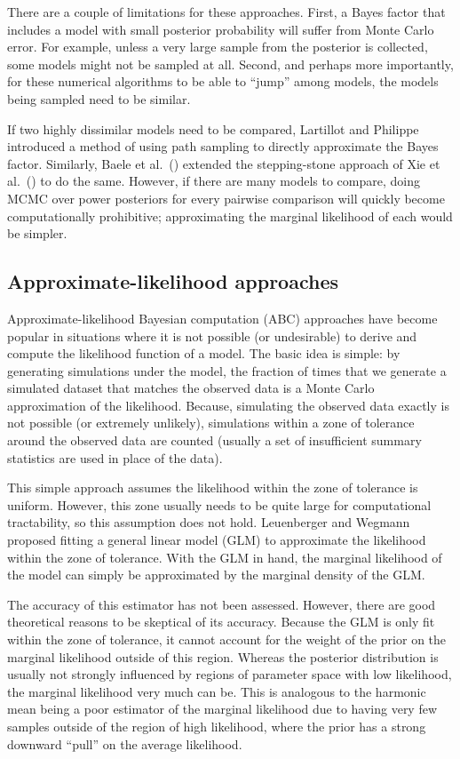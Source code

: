 There are a couple of limitations for these approaches.
First, a Bayes factor that includes a model with small posterior probability
will suffer from Monte Carlo error.
For example, unless a very large sample from the posterior is collected, some
models might not be sampled at all.
Second, and perhaps more importantly, for these numerical algorithms to be able
to ``jump'' among models, the models being sampled need to be similar.

If two highly dissimilar models need to be compared,
Lartillot and Philippe \citeyear{Lartillot2006} introduced a method of using
path sampling to directly approximate the Bayes factor.
Similarly, Baele et al.\ (\citeyear{Baele2013}) extended the stepping-stone
approach of Xie et al.\  (\citeyear{Xie2011}) to do the same.
However, if there are many models to compare, doing MCMC over power posteriors
for every pairwise comparison will quickly become computationally prohibitive;
approximating the marginal likelihood of each would be simpler.

\subsection{Approximate-likelihood approaches}

Approximate-likelihood Bayesian computation (ABC) approaches
\citep{Tavare1997,Beaumont2002} have become popular in situations where it is
not possible (or undesirable) to derive and compute the likelihood function of
a model.
The basic idea is simple: by generating simulations under the model, the
fraction of times that we generate a simulated dataset that matches the observed
data is a Monte Carlo approximation of the likelihood.
Because, simulating the observed data exactly is not possible (or extremely
unlikely), simulations within a zone of tolerance around the observed data are
counted (usually a set of insufficient summary statistics are used in place of
the data).

This simple approach assumes the likelihood within the zone of tolerance is
uniform.
However, this zone usually needs to be quite large for computational
tractability, so this assumption does not hold.
Leuenberger and Wegmann \citep{Leuenberger2010} proposed fitting a general
linear model (GLM) to approximate the likelihood within the zone of tolerance.
With the GLM in hand, the marginal likelihood of the model can simply be
approximated by the marginal density of the GLM.

The accuracy of this estimator has not been assessed.
However, there are good theoretical reasons to be skeptical of its accuracy.
Because the GLM is only fit within the zone of tolerance, it cannot account for
the weight of the prior on the marginal likelihood outside of this region.
Whereas the posterior distribution is usually not strongly influenced by
regions of parameter space with low likelihood, the marginal likelihood very
much can be.
This is analogous to the harmonic mean being a poor estimator of the marginal
likelihood due to having very few samples outside of the region of high
likelihood, where the prior has a strong downward ``pull'' on the average
likelihood.

